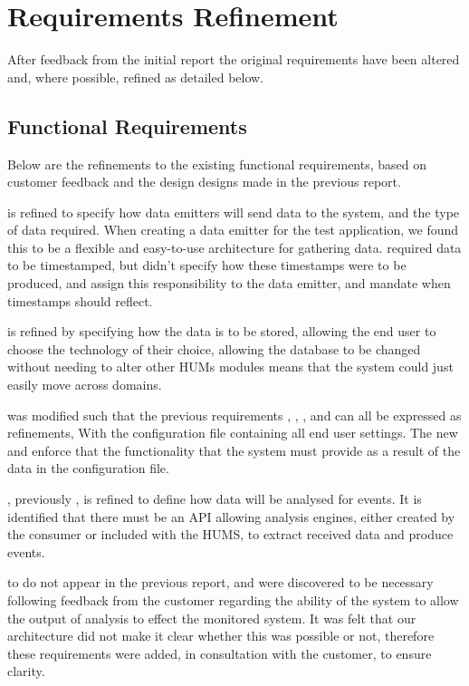 \section{Requirements Refinement}
\label{sec:requirements}
After feedback from the initial report the original requirements have been altered and, where possible, refined as detailed below.

\subsection{Functional Requirements}
\label{sec:requirements-functional}
Below are the refinements to the existing functional requirements, based on customer feedback and the design designs made in the previous report.

 is refined to specify how data emitters will send data to the system, and the type of data required. When creating a data emitter for the test application, we found this to be a flexible and easy-to-use architecture for gathering data. 
 required data to be timestamped, but didn't specify how these timestamps were to be produced,  and  assign this
responsibility to the data emitter, and mandate when timestamps
should reflect.

 is refined by specifying how the data is to be stored, allowing the end user to choose the technology of their choice, allowing the database to be changed without needing to alter other HUMs modules means that the system could just easily move across domains.

 was modified such that the previous requirements , , , and  can all be expressed as refinements, With the configuration file containing all end user settings. The new  and  enforce that the  functionality that the system must provide as a result of the data in the configuration file.

, previously , is refined to define how data will be analysed for events. It is identified that there must be an API allowing analysis engines, either created by the consumer or included with the HUMS, to extract received data and produce events. 

 to  do not appear in the previous report, and were discovered to be necessary following feedback from the customer regarding the ability of the system to allow the output of analysis to effect the monitored system. It was felt that our architecture did not make it clear whether this was possible or not, therefore these requirements were added, in consultation with the customer, to ensure clarity.

